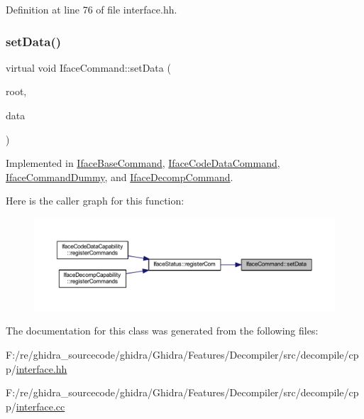 Definition at line 76 of file interface.\+hh.

\mbox{\label{class_iface_command_ad0a0ba80d392ef1346c43283a8c3ca90}} 
\subsubsection{\texorpdfstring{setData()}{setData()}}
{\footnotesize\ttfamily virtual void Iface\+Command\+::set\+Data (\begin{DoxyParamCaption}\item[{\mbox{\hyperlink{class_iface_status}{Iface\+Status}} $\ast$}]{root,  }\item[{\mbox{\hyperlink{class_iface_data}{Iface\+Data}} $\ast$}]{data }\end{DoxyParamCaption})\hspace{0.3cm}{\ttfamily [pure virtual]}}



Implemented in \mbox{\hyperlink{class_iface_base_command_a551f7828c74ff2c0324ed4b3c0210039}{Iface\+Base\+Command}}, \mbox{\hyperlink{class_iface_code_data_command_a778193a98c1a977a3635e63eb15a26d0}{Iface\+Code\+Data\+Command}}, \mbox{\hyperlink{class_iface_command_dummy_a6cde79d0cd9edb822fa594259de68826}{Iface\+Command\+Dummy}}, and \mbox{\hyperlink{class_iface_decomp_command_ad9bcf72bbdc7faddd7a23a1a4d127b0c}{Iface\+Decomp\+Command}}.

Here is the caller graph for this function\+:
\nopagebreak
\begin{figure}[H]
\begin{center}
\leavevmode
\includegraphics[width=350pt]{class_iface_command_ad0a0ba80d392ef1346c43283a8c3ca90_icgraph}
\end{center}
\end{figure}


The documentation for this class was generated from the following files\+:\begin{DoxyCompactItemize}
\item 
F\+:/re/ghidra\+\_\+sourcecode/ghidra/\+Ghidra/\+Features/\+Decompiler/src/decompile/cpp/\mbox{\hyperlink{interface_8hh}{interface.\+hh}}\item 
F\+:/re/ghidra\+\_\+sourcecode/ghidra/\+Ghidra/\+Features/\+Decompiler/src/decompile/cpp/\mbox{\hyperlink{interface_8cc}{interface.\+cc}}\end{DoxyCompactItemize}
